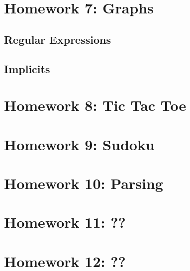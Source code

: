 \documentclass{book}
\begin{document}

\chapter{Homework  7: Graphs}

\newlecture

\section{Regular Expressions}

\newlecture

\section{Implicits}


\newlecture

\chapter{Homework 8: Tic Tac Toe}

\newlecture


\newlecture

\newlecture


\chapter{Homework 9: Sudoku}

\newlecture

\newlecture


\chapter{Homework 10: Parsing}

\newlecture

\newlecture


\chapter{Homework 11: ??}

\newlecture

\newlecture

\chapter{Homework 12: ??}

\newlecture

\newlecture

\end{document}
